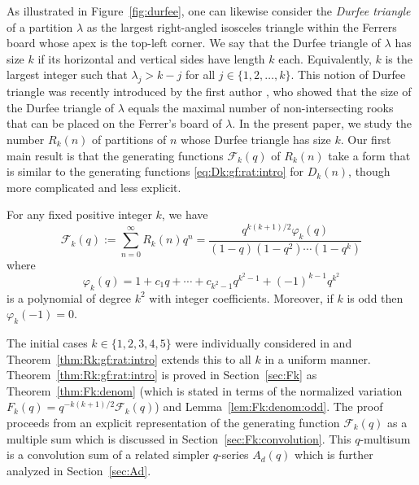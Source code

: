 \documentclass[11pt]{article}
\theoremstyle{plain}
\theoremstyle{definition}
\newcommand{\assign}{:=}
\begin{document}
As illustrated in Figure~\ref{fig:durfee}, one can likewise consider the
\emph{Durfee triangle} of a partition $\lambda$ as the largest right-angled
isosceles triangle within the Ferrers board whose apex is the top-left corner.
We say that the Durfee triangle of $\lambda$ has size $k$ if its horizontal
and vertical sides have length $k$ each. Equivalently, $k$ is the largest
integer such that $\lambda_j > k - j$ for all $j \in \{ 1, 2, \ldots, k \}$.
This notion of Durfee triangle was recently introduced by the first author
\cite{sharan-rook}, who showed that the size of the Durfee triangle of
$\lambda$ equals the maximal number of non-intersecting rooks that can be
placed on the Ferrer's board of $\lambda$. In the present paper, we study the
number $R_k (n)$ of partitions of $n$ whose Durfee triangle has size $k$. Our
first main result is that the generating functions $\mathcal{F}_k (q)$ of $R_k
(n)$ take a form that is similar to the generating functions
\eqref{eq:Dk:gf:rat:intro} for $D_k (n)$, though more complicated and less
explicit.

\begin{theorem}
  \label{thm:Rk:gf:rat:intro}For any fixed positive integer $k$, we have
  \begin{equation}
    \mathcal{F}_k (q) \assign \sum_{n = 0}^{\infty} R_k (n) q^n = \frac{q^{k
    (k + 1) / 2} \varphi_k (q)}{(1 - q) (1 - q^2) \cdots (1 - q^k)}
    \label{eq:Rk:gf:rat:intro}
  \end{equation}
  where
  \begin{equation*}
    \varphi_k (q) = 1 + c_1 q + \cdots + c_{k^2 - 1} q^{k^2 - 1} + (- 1)^{k -
     1} q^{k^2}
  \end{equation*}
  is a polynomial of degree $k^2$ with integer coefficients. Moreover, if $k$
  is odd then $\varphi_k (- 1) = 0$.
\end{theorem}

The initial cases $k \in \{ 1, 2, 3, 4, 5 \}$ were individually considered in
\cite{sharan-rook} and Theorem~\ref{thm:Rk:gf:rat:intro} extends this to all
$k$ in a uniform manner. Theorem~\ref{thm:Rk:gf:rat:intro} is proved in
Section~\ref{sec:Fk} as Theorem~\ref{thm:Fk:denom} (which is stated in terms
of the normalized variation $F_k (q) = q^{- k (k + 1) / 2} \mathcal{F}_k (q)$)
and Lemma~\ref{lem:Fk:denom:odd}. The proof proceeds from an explicit
representation of the generating function $\mathcal{F}_k (q)$ as a multiple
sum which is discussed in Section~\ref{sec:Fk:convolution}. This $q$-multisum
is a convolution sum of a related simpler $q$-series $A_d (q)$ which is
further analyzed in Section~\ref{sec:Ad}.
\end{document}
